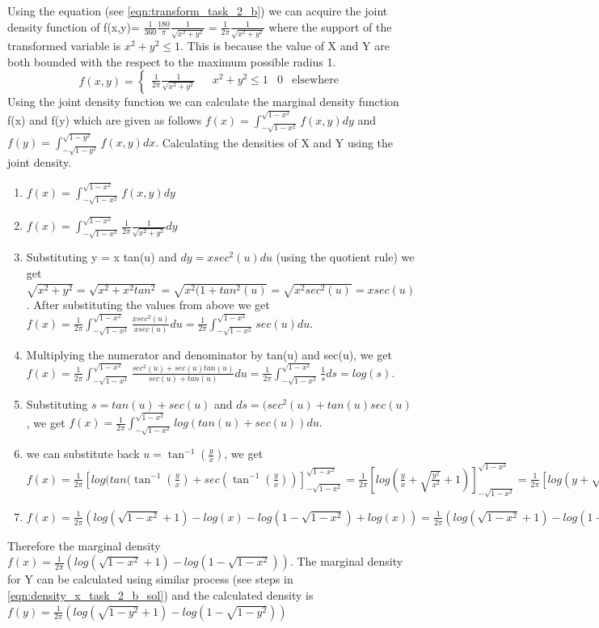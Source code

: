 Using the equation (see \ref{eqn:transform_task_2_b}) we can acquire the joint density function of f(x,y)= $\frac{1}{360}\frac{180}{\pi}\frac{1}{\sqrt{x^2+y^2}} = \frac{1}{2\pi}\frac{1}{\sqrt{x^2+y^2}}$ where the support of the transformed variable is $x^2+y^2 \leq 1$. This is because the value of X and Y are both bounded with the respect to the maximum possible radius 1.
\begin{equation}\label{eqn:density_task_2_b}
   f(x,y) =  \begin{cases*}
   \frac{1}{2\pi}\frac{1}{\sqrt{x^2+y^2}} &\text{ $x^2+y^2 \leq 1$}
    &0&\text{elsewhere}
\end{cases*}
\end{equation}
Using the joint density function we can calculate the marginal density function f(x) and f(y) which are given as follows $f(x) = \int_{-\sqrt{1-x^2}}^{\sqrt{1-x^2}} f(x,y) dy $ and $f(y) = \int_{-\sqrt{1-y^2}}^{\sqrt{1-y^2}} f(x,y) dx .$
Calculating the densities of X and Y using the joint density.
\begin{enumerate}\label{eqn:density_x_task_2_b_sol}
    \item $f(x) = \int_{-\sqrt{1-x^2}}^{\sqrt{1-x^2}} f(x,y) dy $
    \item $f(x) = \int_{-\sqrt{1-x^2}}^{\sqrt{1-x^2}} \frac{1}{2\pi}\frac{1}{\sqrt{x^2+y^2}} dy$
    \item Substituting y = x tan(u) and $dy = x sec^2(u)du$ (using the quotient rule) we get $\sqrt{x^2+y^2}= \sqrt{x^2+x^2tan^2}= \sqrt{x^2(1+tan^2(u)} = \sqrt{x^2sec^2(u)} = x sec(u)$. \newline After substituting the values from above we get  $f(x) = \frac{1}{2\pi}\int_{-\sqrt{1-x^2}}^{\sqrt{1-x^2}} \frac{xsec^2(u)}{x sec(u)} du = \frac{1}{2\pi}\int_{-\sqrt{1-x^2}}^{\sqrt{1-x^2}} sec(u) du$.
    \item Multiplying the numerator and denominator by tan(u) and sec(u), we get $f(x) = \frac{1}{2\pi}\int_{-\sqrt{1-x^2}}^{\sqrt{1-x^2}} \frac{sec^2(u) + sec(u)tan(u)}{sec(u)+tan(u)}du = \frac{1}{2\pi}\int_{-\sqrt{1-x^2}}^{\sqrt{1-x^2}}\frac{1}{s} ds = log(s).$
    \item Substituting $s = tan(u) + sec(u)$ and $ds = (sec^2(u) +tan(u)sec(u)$, we get $f(x) = \frac{1}{2\pi}\int_{-\sqrt{1-x^2}}^{\sqrt{1-x^2}} log(tan(u) + sec(u)) du .$
    \item we can substitute back $u = \tan^{-1}(\frac{y}{x})$, we get $f(x) = \frac{1}{2\pi}[log(tan(\tan^{-1}(\frac{y}{x}) + sec(\tan^{-1}(\frac{y}{x}))]_{-\sqrt{1-x^2}}^{\sqrt{1-x^2}} = \frac{1}{2\pi}[log(\frac{y}{x} + \sqrt{\frac{y^2}{x^2}}+1)]_{-\sqrt{1-x^2}}^{\sqrt{1-x^2}} = \frac{1}{2\pi}[log(y + \sqrt{y^2+x^2}) -log(x))]_{-\sqrt{1-x^2}}^{\sqrt{1-x^2}}$
    \item $f(x) = \frac{1}{2\pi} (log(\sqrt{1-x^2}+1) - log(x) - log(1-\sqrt{1-x^2})+ log(x))= \frac{1}{2\pi} (log(\sqrt{1-x^2}+1)- log(1-\sqrt{1-x^2})) $
\end{enumerate} 
Therefore the marginal density $f(x) = \frac{1}{2\pi} (log(\sqrt{1-x^2}+1)- log(1-\sqrt{1-x^2}))$. The marginal density for Y can be calculated using similar process (see steps in \ref{eqn:density_x_task_2_b_sol}) and the calculated density is $f(y) =  \frac{1}{2\pi} (log(\sqrt{1-y^2}+1)- log(1-\sqrt{1-y^2}))$

